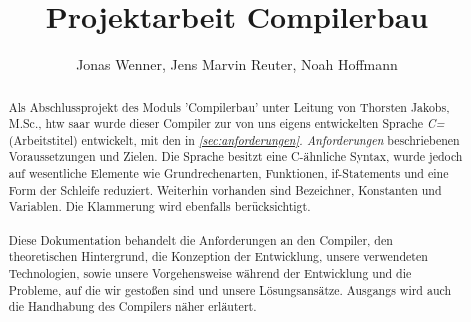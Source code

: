 \documentclass[12pt, a4paper, oneside, ngerman]{article}
\title{Projektarbeit Compilerbau}
\begin{document}
\author{Jonas Wenner, Jens Marvin Reuter, Noah Hoffmann}

\maketitle
\thispagestyle{empty}
\pagebreak
\tableofcontents
\newpage


\begin{abstract}

\noindent
Als Abschlussprojekt des Moduls 'Compilerbau' unter Leitung von Thorsten Jakobs, M.Sc., htw saar wurde dieser Compiler zur von uns eigens entwickelten Sprache \textit{C=} (Arbeitstitel) entwickelt, mit den in \textit{\ref{sec:anforderungen}. Anforderungen} beschriebenen Voraussetzungen und Zielen. Die Sprache besitzt eine C-ähnliche Syntax, wurde jedoch auf wesentliche Elemente wie Grundrechenarten, Funktionen, if-Statements und eine Form der Schleife reduziert. Weiterhin vorhanden sind Bezeichner, Konstanten und Variablen. Die Klammerung wird ebenfalls berücksichtigt.
\\\\
Diese Dokumentation behandelt die Anforderungen an den Compiler, den theoretischen Hintergrund, die Konzeption der Entwicklung, unsere verwendeten Technologien, sowie unsere Vorgehensweise während der Entwicklung und die Probleme, auf die wir gestoßen sind und unsere Lösungsansätze. Ausgangs wird auch die Handhabung des Compilers näher erläutert.

\end{abstract}

\newpage

\pagebreak

\pagebreak

\pagebreak

\pagebreak

\pagebreak

\pagebreak

\pagebreak

\pagebreak
\end{document}
